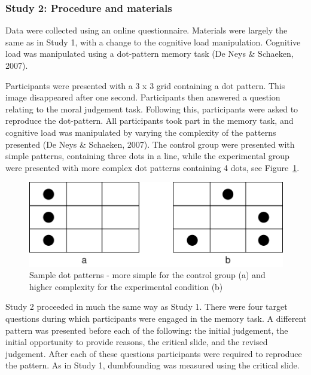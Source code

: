 \documentclass[
  american,
  man,floatsintext]{apa7}
\begin{document}
\hypertarget{study-2-procedure-and-materials}{%
\subsubsection{Study 2: Procedure and materials}\label{study-2-procedure-and-materials}}

Data were collected using an online questionnaire. Materials were largely the same as in Study 1, with a change to the cognitive load manipulation. Cognitive load was manipulated using a dot-pattern memory task (De Neys \& Schaeken, 2007).

Participants were presented with a 3 x 3 grid containing a dot pattern. This image disappeared after one second. Participants then answered a question relating to the moral judgement task. Following this, participants were asked to reproduce the dot-pattern. All participants took part in the memory task, and cognitive load was manipulated by varying the complexity of the patterns presented (De Neys \& Schaeken, 2007). The control group were presented with simple patterns, containing three dots in a line, while the experimental group were presented with more complex dot patterns containing 4 dots, see Figure~\ref{fig:S2dotpattern}.

\begin{figure}
\centering
\includegraphics{Study_2_files/figure-latex/S2dotpattern-1.pdf}
\caption{\label{fig:S2dotpattern}Sample dot patterns - more simple for the control group (a) and higher complexity for the experimental condition (b)}
\end{figure}

Study 2 proceeded in much the same way as Study 1. There were four target questions during which participants were engaged in the memory task. A different pattern was presented before each of the following: the initial judgement, the initial opportunity to provide reasons, the critical slide, and the revised judgement. After each of these questions participants were required to reproduce the pattern. As in Study 1, dumbfounding was measured using the critical slide.
\end{document}
